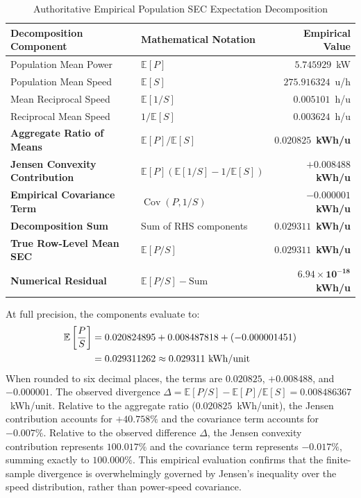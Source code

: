 \documentclass[journal]{IEEEtran}
\begin{document}
\begin{table}[t]
\centering
\caption{Authoritative Empirical Population SEC Expectation Decomposition}
\label{tab:sec_decomposition}
\footnotesize
\setlength{\tabcolsep}{10pt}
\begin{tabular}{llr}
\toprule
\textbf{Decomposition Component} & \textbf{Mathematical Notation} & \textbf{Empirical Value} \\
\midrule
Population Mean Power & $\mathbb{E}[P]$ & $5.745929$~kW \\
Population Mean Speed & $\mathbb{E}[S]$ & $275.916324$~u/h \\
Mean Reciprocal Speed & $\mathbb{E}[1/S]$ & $0.005101$~h/u \\
Reciprocal Mean Speed & $1/\mathbb{E}[S]$ & $0.003624$~h/u \\
\midrule
\textbf{Aggregate Ratio of Means} & $\mathbb{E}[P] / \mathbb{E}[S]$ & $\mathbf{0.020825}$~\textbf{kWh/u} \\
\textbf{Jensen Convexity Contribution} & $\mathbb{E}[P] (\mathbb{E}[1/S] - 1/\mathbb{E}[S])$ & $\mathbf{+0.008488}$~\textbf{kWh/u} \\
\textbf{Empirical Covariance Term} & $\operatorname{Cov}(P, 1/S)$ & $\mathbf{-0.000001}$~\textbf{kWh/u} \\
\midrule
\textbf{Decomposition Sum} & Sum of RHS components & $\mathbf{0.029311}$~\textbf{kWh/u} \\
\textbf{True Row-Level Mean SEC} & $\mathbb{E}[P/S]$ & $\mathbf{0.029311}$~\textbf{kWh/u} \\
\midrule
\textbf{Numerical Residual} & $\mathbb{E}[P/S] - \text{Sum}$ & $\mathbf{6.94 \times 10^{-18}}$~\textbf{kWh/u} \\
\bottomrule
\end{tabular}
\end{table}

At full precision, the components evaluate to:
\begin{align}
\mathbb{E}\left[\frac{P}{S}\right] &= 0.020824895 + 0.008487818 + (-0.000001451) \notag \\
&= 0.029311262 \approx 0.029311 \text{ kWh/unit}
\end{align}
When rounded to six decimal places, the terms are $0.020825$, $+0.008488$, and $-0.000001$. The observed divergence $\Delta = \mathbb{E}[P/S] - \mathbb{E}[P]/\mathbb{E}[S] = 0.008486367$~kWh/unit. Relative to the aggregate ratio ($0.020825$~kWh/unit), the Jensen contribution accounts for $+40.758\%$ and the covariance term accounts for $-0.007\%$. Relative to the observed difference $\Delta$, the Jensen convexity contribution represents $100.017\%$ and the covariance term represents $-0.017\%$, summing exactly to $100.000\%$. This empirical evaluation confirms that the finite-sample divergence is overwhelmingly governed by Jensen's inequality over the speed distribution, rather than power-speed covariance.
\end{document}
